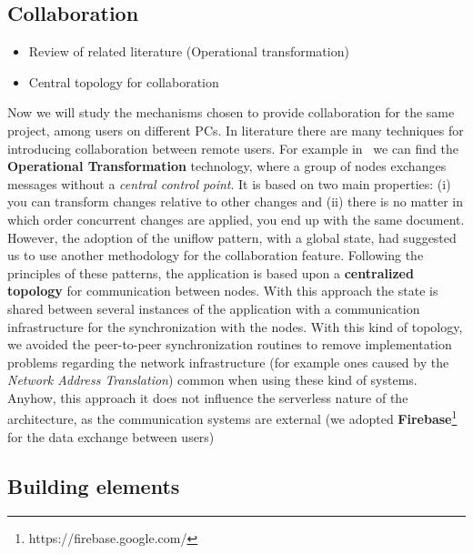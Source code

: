 \subsection{Collaboration}

\begin{itemize}
 \item Review of related literature (Operational transformation)
 \item Central topology for collaboration
\end{itemize}



Now we will study the mechanisms chosen to provide collaboration for the same project, among users on different PCs. In literature there are many techniques for introducing collaboration between remote users. For example in~\cite{Ellis:1989:CCG:66926.66963} we can find the \textbf{Operational Transformation} technology, where a group of nodes exchanges messages without a \textit{central control point}. It is based on two main properties: (i) you can transform changes relative to other changes and (ii) there is no matter in which order concurrent changes are applied, you end up with the same document.\\

However, the adoption of the uniflow pattern, with a global state, had suggested us to use another methodology for the collaboration feature. Following the principles of these patterns, the application is based upon a \textbf{centralized topology} for communication between nodes. With this approach the state is shared between several instances of the application with a communication infrastructure for the synchronization with the nodes. With this kind of topology, we avoided the peer-to-peer synchronization routines to remove implementation problems regarding the network infrastructure (for example ones caused by the \textit{Network Address Translation}) common when using these kind of systems. Anyhow, this approach it does not influence the serverless nature of the architecture, as the communication systems are external (we adopted \textbf{Firebase}\footnote{https://firebase.google.com/} for the data exchange between users)


\subsection{Building elements}\label{building_elements}

